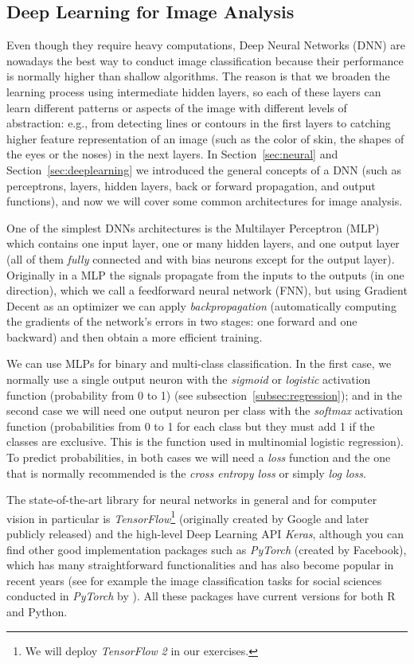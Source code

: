 \subsection{Deep Learning for Image Analysis}\label{subsec:deep}

Even though they require heavy computations, Deep Neural Networks (DNN) are nowadays the best way to conduct image classification because their performance is normally higher than shallow algorithms. The reason is that we broaden the learning process using intermediate hidden layers, so each of these layers can learn different patterns or aspects of the image with different levels of abstraction: e.g., from detecting lines or contours in the first layers to catching higher feature representation of an image (such as the color of skin, the shapes of the eyes or the noses) in the next layers. In Section~\ref{sec:neural} and Section~\ref{sec:deeplearning} we introduced the general concepts of a DNN (such as perceptrons, layers, hidden layers, back or forward propagation, and output functions), and now we will cover some common architectures for image analysis.

One of the simplest DNNs architectures is the Multilayer Perceptron (MLP) which contains one input layer, one or many hidden layers, and one output layer (all of them \textit{fully} connected and with bias neurons except for the output layer). Originally in a MLP the signals propagate from the inputs to the outputs (in one direction), which we call a feedforward neural network (FNN), but using Gradient Decent as an optimizer we can apply \textit{backpropagation} (automatically computing the gradients of the network's errors in two stages: one forward and one backward) and then obtain a more efficient training.

We can use MLPs for binary and multi-class classification. In the first case, we normally use a single output neuron with the \textit{sigmoid} or \textit{logistic} activation function (probability from 0 to 1) (see subsection~\ref{subsec:regression}); and in the second case we will need one output neuron per class with the \textit{softmax} activation function (probabilities from 0 to 1 for each class but they must add 1 if the classes are exclusive. This is the function used in multinomial logistic regression). To predict probabilities, in both cases we will need a \textit{loss} function and the one that is normally recommended is the \textit{cross entropy loss} or simply \textit{log loss}.

The state-of-the-art library for neural networks in general and for computer vision in particular is \emph{TensorFlow}\footnote{We will deploy \emph{TensorFlow} \textit{2} in our exercises.}  (originally created by Google and later publicly released) and the high-level Deep Learning API \emph{Keras}, although you can find other good implementation packages such as \emph{PyTorch} (created by Facebook), which has many straightforward functionalities and has also become popular in recent years (see for example the image classification tasks for social sciences conducted in \emph{PyTorch} by \citet{williams2020images}). All these packages have current versions for both R and Python.

